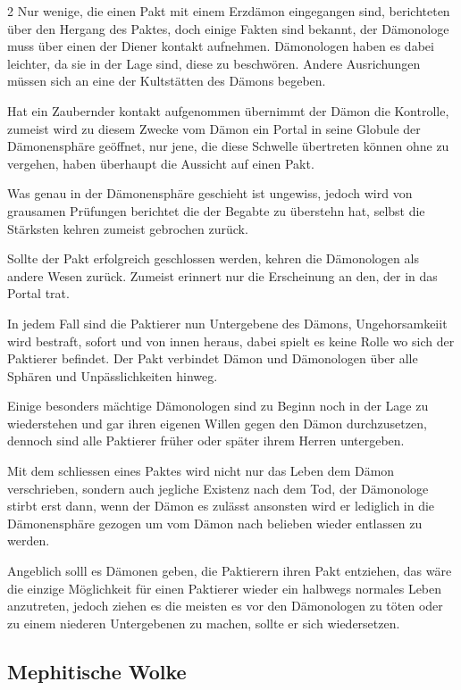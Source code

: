 \begin{multicols}{2}
Nur wenige, die einen Pakt mit einem Erzdämon eingegangen sind, berichteten über den Hergang des Paktes, doch einige Fakten sind bekannt, der Dämonologe muss über einen der Diener kontakt aufnehmen. Dämonologen haben es dabei leichter, da sie in der Lage sind, diese zu beschwören. Andere Ausrichungen müssen sich an eine der Kultstätten des Dämons begeben.

Hat ein Zaubernder kontakt aufgenommen übernimmt der Dämon die Kontrolle, zumeist wird zu diesem Zwecke vom Dämon ein Portal in seine Globule der Dämonensphäre geöffnet, nur jene, die diese Schwelle übertreten können ohne zu vergehen, haben überhaupt die Aussicht auf einen Pakt.

Was genau in der Dämonensphäre geschieht ist ungewiss, jedoch wird von grausamen Prüfungen berichtet die der Begabte zu überstehn hat, selbst die Stärksten kehren zumeist gebrochen zurück. 

Sollte der Pakt erfolgreich geschlossen werden, kehren die Dämonologen als andere Wesen zurück. Zumeist erinnert nur die Erscheinung an den, der in das Portal trat.

In jedem Fall sind die Paktierer nun Untergebene des Dämons, Ungehorsamkeiit wird bestraft, sofort und von innen heraus, dabei spielt es keine Rolle wo sich der Paktierer befindet. Der Pakt verbindet Dämon und Dämonologen über alle Sphären und Unpässlichkeiten hinweg.

Einige besonders mächtige Dämonologen sind zu Beginn noch in der Lage zu wiederstehen und gar ihren eigenen Willen gegen den Dämon durchzusetzen, dennoch sind alle Paktierer früher oder später ihrem Herren untergeben.

Mit dem schliessen eines Paktes wird nicht nur das Leben dem Dämon verschrieben, sondern auch jegliche Existenz nach dem Tod, der Dämonologe stirbt erst dann, wenn der Dämon es zulässt ansonsten wird er lediglich in die Dämonensphäre gezogen um vom Dämon nach belieben wieder entlassen zu werden.

Angeblich solll es Dämonen geben, die Paktierern ihren Pakt entziehen, das wäre die einzige Möglichkeit für einen Paktierer wieder ein halbwegs normales Leben anzutreten, jedoch ziehen es die meisten es vor den Dämonologen zu töten oder zu einem niederen Untergebenen zu machen, sollte er sich wiedersetzen.


\subsection*{Mephitische Wolke}


\end{multicols}

